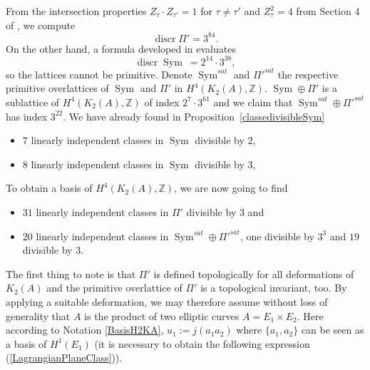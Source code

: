 \documentclass{alggeom}
\DeclareMathOperator{\Sym}{Sym}
\DeclareMathOperator{\discr}{discr}
\newcommand{\kum}[2]{K_{ #2 }( #1 )}
\newcommand{\X}{\kum{A}{2}}
\newcommand{\Z}{\mathbb{Z}}
\theoremstyle{plain}
\theoremstyle{definition}
\theoremstyle{remark}
\begin{document}
From the intersection properties $Z_\tau \cdot Z_{\tau'} = 1$ for $\tau\neq \tau'$ and $Z_\tau^2 = 4$ from Section 4 of \cite{Hassett}, we compute
\begin{equation}
 \discr \Pi' = 3^{84}.
 \label{discrPi}
\end{equation}
On the other hand, a formula developed in \cite{Kapfer} evaluates
\begin{equation} \label{DiscrSym}
\discr \Sym \ = 2^{14}\cdot 3^{38},
\end{equation}
so the lattices cannot be primitive. Denote $\Sym^{sat}$ and $\Pi'^{sat}$ the respective primitive overlattices of $\Sym$ and $\Pi'$ in $H^4(\X,\Z)$. $\Sym \oplus\Pi'$ is a sublattice of $H^4(\X,\Z)$ of index $2^{7}\cdot 3^{61}$ and we claim that $\Sym^{sat}\oplus \Pi'^{sat}$ has index $3^{22}$. 
We have already found in Proposition~\ref{classedivisibleSym}
\begin{itemize}
 \item $7$ linearly independent classes in $\Sym$ divisible by $2$,
 \item $8$ linearly independent classes in $\Sym$ divisible by $3$,
\end{itemize}
To obtain a basis of $H^4(\X,\Z)$, 
we are now going to find
\begin{itemize}
 \item $31$ linearly independent classes in $\Pi'$ divisible by $3$ and
 \item $20$ linearly independent classes in $\Sym^{sat}\oplus \Pi'^{sat}$, one divisible by $3^3$ and $19$ divisible by $3$.
\end{itemize}


The first thing to note is that $\Pi'$ is defined topologically for all deformations of $\X$ and the primitive overlattice of $\Pi'$ is a topological invariant, too.  
By applying a suitable deformation, we may therefore assume without loss of generality that $A$ is the product of two elliptic curves $A=E_1\times E_2$. Here according to Notation \ref{BasisH2KA}, $u_1:=j(a_1 a_2)$ where $\{a_1,a_2\}$ can be seen as a basis of $H^1(E_1)$ (it is necessary to obtain the following expression (\ref{LagrangianPlaneClass})).
\end{document}
